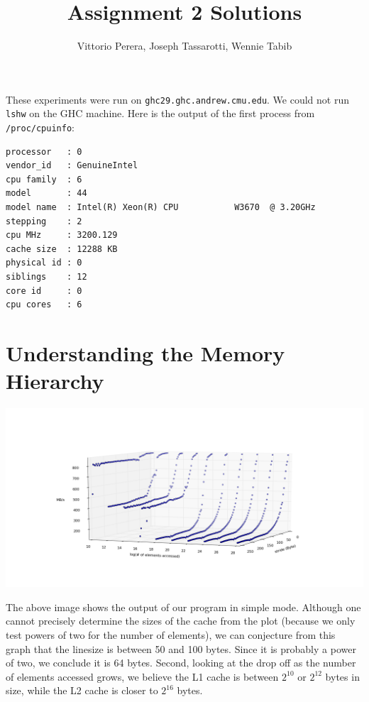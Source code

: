 \documentclass[10pt]{article}
\begin{document}
\title{Assignment 2 Solutions}
\author{Vittorio Perera, Joseph Tassarotti, Wennie Tabib}
\maketitle

These experiments were run on {\tt ghc29.ghc.andrew.cmu.edu}. We could not run {\tt lshw} on the GHC machine. Here is the output of the first
process from {\tt /proc/cpuinfo}:
\begin{verbatim}
processor   : 0
vendor_id   : GenuineIntel
cpu family  : 6
model       : 44
model name  : Intel(R) Xeon(R) CPU           W3670  @ 3.20GHz
stepping    : 2
cpu MHz     : 3200.129
cache size  : 12288 KB
physical id : 0
siblings    : 12
core id     : 0
cpu cores   : 6
\end{verbatim}



\section*{Understanding the Memory Hierarchy}

\begin{center}
\includegraphics[scale=0.3]{images/mountain2}
\end{center}

The above image shows the output of our program in simple mode. Although one
cannot precisely determine the sizes of the cache from the plot (because we
only test powers of two for the number of elements), we can conjecture from
this graph that the linesize is between 50 and 100 bytes. Since it is probably
a power of two, we conclude it is 64 bytes. Second, looking at the drop off as
the number of elements accessed grows, we believe the L1 cache is between
$2^{10}$ or $2^12$ bytes in size, while the L2 cache is closer to $2^{16}$
bytes. 
\end{document}
